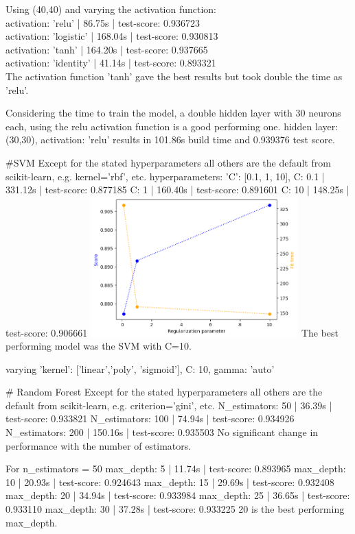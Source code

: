 \documentclass[12pt, letterpaper]{article}
\begin{document}
Using (40,40) and varying the activation function: \\
activation:  'relu' | 86.75s | test-score: 0.936723 \\ 
activation: 'logistic' | 168.04s | test-score: 0.930813 \\ 
activation: 'tanh' | 164.20s | test-score: 0.937665 \\ 
activation: 'identity' | 41.14s | test-score: 0.893321 \\ 
The activation function 'tanh' gave the best results but took double the time as 'relu'.

Considering the time to train the model, a double hidden layer with 30 neurons each, using the relu activation function is a good performing one.
hidden layer: (30,30), activation: 'relu' results in 101.86s build time and 0.939376 test score.

#SVM
Except for the stated hyperparameters all others are the default from scikit-learn, e.g. kernel='rbf', etc.
hyperparameters: 'C': [0.1, 1, 10],
C: 0.1 | 331.12s | test-score: 0.877185
C: 1 | 160.40s | test-score: 0.891601
C: 10 | 148.25s | test-score: 0.906661
\includegraphics[width=0.6\textwidth]{svm_c_compiled.png}
The best performing model was the SVM with C=10.

varying 'kernel': ['linear','poly', 'sigmoid'], C: 10, gamma: 'auto'

# Random Forest
Except for the stated hyperparameters all others are the default from scikit-learn, e.g. criterion='gini', etc.
N_estimators: 50 | 36.39s | test-score: 0.933821
N_estimators: 100 | 74.94s | test-score: 0.934926
N_estimators: 200 | 150.16s | test-score: 0.935503
No significant change in performance with the number of estimators.

For n_estimators = 50
max_depth: 5 | 11.74s | test-score: 0.893965
max_depth: 10 | 20.93s | test-score: 0.924643
max_depth: 15 | 29.69s | test-score: 0.932408
max_depth: 20 | 34.94s | test-score: 0.933984
max_depth: 25 | 36.65s | test-score: 0.933110
max_depth: 30 | 37.28s | test-score: 0.933225
20 is the best performing max_depth.
\end{document}
